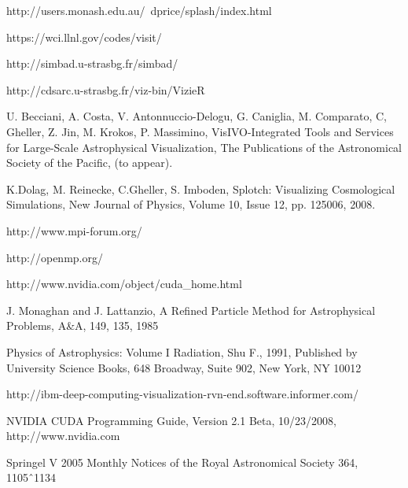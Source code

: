 \begin{thebibliography}{00}
 http://users.monash.edu.au/~dprice/splash/index.html

 https://wci.llnl.gov/codes/visit/

 http://simbad.u-strasbg.fr/simbad/

 http://cdsarc.u-strasbg.fr/viz-bin/VizieR

U. Becciani, A. Costa, V. Antonnuccio-Delogu, G. Caniglia, M. Comparato, C, Gheller, Z. Jin, M. Krokos, P. Massimino, VisIVO-Integrated Tools and Services for Large-Scale Astrophysical Visualization, The Publications of the Astronomical Society of the Pacific, (to appear).

K.Dolag, M. Reinecke, C.Gheller, S. Imboden, Splotch: Visualizing Cosmological Simulations, New Journal of Physics, Volume 10, Issue 12, pp. 125006, 2008.

 http://www.mpi-forum.org/

 http://openmp.org/

 http://www.nvidia.com/object/cuda\_home.html

 J. Monaghan and J. Lattanzio, A Refined Particle Method for Astrophysical Problems, A\&A, 149, 135, 1985

 Physics of Astrophysics: Volume I Radiation, Shu F., 1991,
Published by University Science Books, 648 Broadway, Suite 902, New York, NY 10012

 http://ibm-deep-computing-visualization-rvn-end.software.informer.com/

 NVIDIA CUDA Programming Guide, Version 2.1 Beta, 10/23/2008, http://www.nvidia.com

 Springel V 2005 Monthly Notices of the Royal Astronomical Society 364, 1105ˆ1134

\end{thebibliography}



